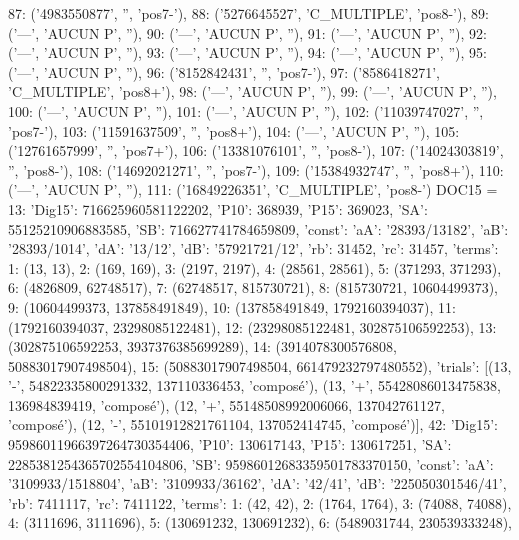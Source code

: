 \documentclass[11pt,a4paper]{article}
\begin{document}
\begin{pycode}
{ 87: ('4983550877', '', 'pos7-'),
 88: ('5276645527', 'C_MULTIPLE', 'pos8-'),
 89: ('---', 'AUCUN P', ''),
 90: ('---', 'AUCUN P', ''),
 91: ('---', 'AUCUN P', ''),
 92: ('---', 'AUCUN P', ''),
 93: ('---', 'AUCUN P', ''),
 94: ('---', 'AUCUN P', ''),
 95: ('---', 'AUCUN P', ''),
 96: ('8152842431', '', 'pos7-'),
 97: ('8586418271', 'C_MULTIPLE', 'pos8+'),
 98: ('---', 'AUCUN P', ''),
 99: ('---', 'AUCUN P', ''),
 100: ('---', 'AUCUN P', ''),
 101: ('---', 'AUCUN P', ''),
 102: ('11039747027', '', 'pos7-'),
 103: ('11591637509', '', 'pos8+'),
 104: ('---', 'AUCUN P', ''),
 105: ('12761657999', '', 'pos7+'),
 106: ('13381076101', '', 'pos8-'),
 107: ('14024303819', '', 'pos8-'),
 108: ('14692021271', '', 'pos7-'),
 109: ('15384932747', '', 'pos8+'),
 110: ('---', 'AUCUN P', ''),
 111: ('16849226351', 'C_MULTIPLE', 'pos8-')}
DOC15 = {13: {'Dig15': 716625960581122202,
      'P10': 368939,
      'P15': 369023,
      'SA': 55125210906883585,
      'SB': 716627741784659809,
      'const': {'aA': '28393/13182', 'aB': '28393/1014', 'dA': '13/12', 'dB': '57921721/12'},
      'rb': 31452,
      'rc': 31457,
      'terms': {1: (13, 13),
                2: (169, 169),
                3: (2197, 2197),
                4: (28561, 28561),
                5: (371293, 371293),
                6: (4826809, 62748517),
                7: (62748517, 815730721),
                8: (815730721, 10604499373),
                9: (10604499373, 137858491849),
                10: (137858491849, 1792160394037),
                11: (1792160394037, 23298085122481),
                12: (23298085122481, 302875106592253),
                13: (302875106592253, 3937376385699289),
                14: (3914078300576808, 50883017907498504),
                15: (50883017907498504, 661479232797480552)},
      'trials': [(13, '-', 54822335800291332, 137110336453, 'composé'),
                 (13, '+', 55428086013475838, 136984839419, 'composé'),
                 (12, '+', 55148508992006066, 137042761127, 'composé'),
                 (12, '-', 55101912821761104, 137052414745, 'composé')]},
 42: {'Dig15': 95986011966397264730354406,
      'P10': 130617143,
      'P15': 130617251,
      'SA': 2285381254365702554104806,
      'SB': 95986012683359501783370150,
      'const': {'aA': '3109933/1518804', 'aB': '3109933/36162', 'dA': '42/41', 'dB': '225050301546/41'},
      'rb': 7411117,
      'rc': 7411122,
      'terms': {1: (42, 42),
                2: (1764, 1764),
                3: (74088, 74088),
                4: (3111696, 3111696),
                5: (130691232, 130691232),
                6: (5489031744, 230539333248),
}}}
\end{pycode}
\end{document}
